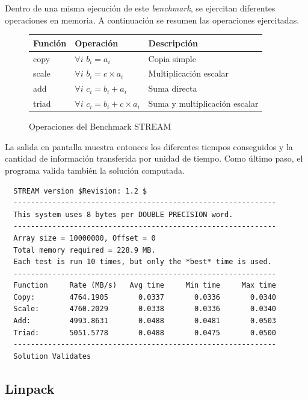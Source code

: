 \documentclass[a4paper]{report}
\begin{document}
\bigskip

Dentro de una misma ejecuci\'on de este {\it benchmark}, se ejercitan diferentes
operaciones en memoria. A continuaci\'on se resumen las operaciones ejercitadas.

\begin{figure}[H]
  \begin{center}
    \begin{tabular}{|l|l|l|}\hline
      {\bf Funci\'on} & {\bf Operaci\'on} & {\bf Descripci\'on} \\ \hline
      copy & $ \forall i $ $ b_{i} = a_{i} $ & Copia simple \\ \hline
      scale & $ \forall i $ $ b_{i} = c \times a_{i} $ & Multiplicaci\'on escalar \\ \hline
      add & $ \forall i $ $ c_{i} = b_{i} + a_{i} $ & Suma directa \\ \hline
      triad & $ \forall i $ $ c_{i} = b_{i} + c \times a_{i} $ & Suma y multiplicaci\'on escalar \\ \hline
    \end{tabular}
    \caption{Operaciones del Benchmark STREAM}
   \end{center}
 \label{stream}
\end{figure}

La salida en pantalla muestra entonces los diferentes tiempos conseguidos y la cantidad de informaci\'on transferida por unidad de tiempo.
Como \'ultimo paso, el programa valida tambi\'en la soluci\'on computada.

\begin{verbatim}
  STREAM version $Revision: 1.2 $
  -------------------------------------------------------------
  This system uses 8 bytes per DOUBLE PRECISION word.
  -------------------------------------------------------------
  Array size = 10000000, Offset = 0
  Total memory required = 228.9 MB.
  Each test is run 10 times, but only the *best* time is used.
  -------------------------------------------------------------
  Function     Rate (MB/s)   Avg time     Min time     Max time
  Copy:        4764.1905       0.0337       0.0336       0.0340
  Scale:       4760.2029       0.0338       0.0336       0.0340
  Add:         4993.8631       0.0488       0.0481       0.0503
  Triad:       5051.5778       0.0488       0.0475       0.0500
  -------------------------------------------------------------
  Solution Validates
\end{verbatim}

\subsection{Linpack}
\end{document}
